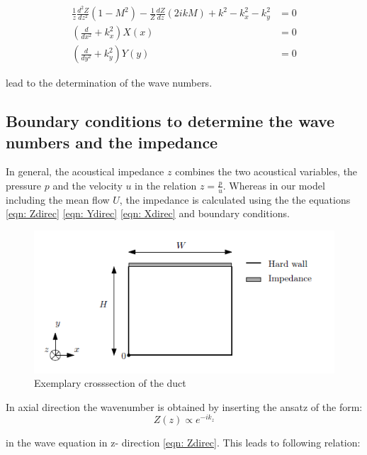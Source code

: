 \documentclass[11pt]{report} %
\begin{document}
\begin{subequations}
\begin{align}
\frac{1}{z}\frac{d^2Z}{dz^2}(1-M^2)-\frac{1}{Z}\frac{dZ}{dz}(2ikM)+k^2-k_x^2-k_y^2&=0 \label{eqn: Zdirec} \\
\left( \frac{d}{dx^2}+k_x^2\right)X(x)&=0 \label{eqn: Ydirec} \\
\left( \frac{d}{dy^2}+k_y^2\right)Y(y)&=0 \label{eqn: Xdirec}
\end{align}
\end{subequations} 

lead to the determination of the wave numbers.   

\subsection{Boundary conditions to determine the wave numbers and the impedance}
In general, the acoustical impedance $z$ combines the two acoustical variables, the pressure $p$ and the velocity $u$ in the relation $z=\frac{p}{u}$. 
Whereas in our model including the mean flow $U$, the impedance is calculated using the the equations \eqref{eqn: Zdirec} \eqref{eqn: Ydirec} \eqref{eqn: Xdirec} and boundary conditions. 

\begin{figure}[H]
\centering
\includegraphics[scale=0.8]{./Figures/Boundary}
\caption{Exemplary crosssection of the duct}
\end{figure}

In axial direction the wavenumber is obtained by inserting the ansatz of the form: 
\begin{equation}
Z(z)\propto e^{-ik_z}
\end{equation}  

in the wave equation in z- direction \eqref{eqn: Zdirec}.
This leads to following relation:
\end{document}

